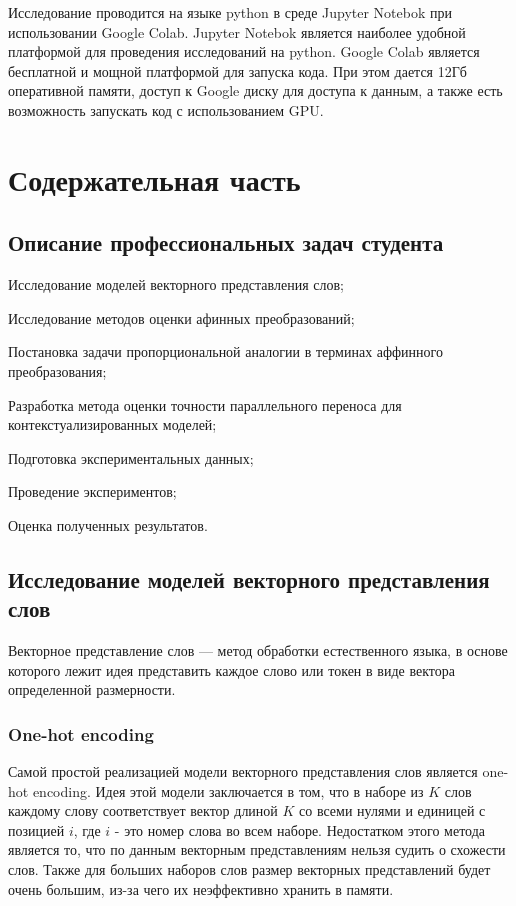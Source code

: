 \documentclass[a4paper,14pt]{article}
\begin{document}
	Исследование проводится на языке python в среде Jupyter Notebok при использовании Google Colab. Jupyter Notebok является наиболее удобной платформой для проведения исследований на python.
	Google Colab является бесплатной и мощной платформой для запуска кода.
	При этом дается 12Гб оперативной памяти, доступ к Google диску для доступа к данным, а также есть возможность запускать код с использованием GPU.
	
	\pagebreak
	\section{Содержательная часть}
	
	\subsection{Описание профессиональных задач студента}
	
	Исследование моделей векторного представления слов;
	
	Исследование методов оценки афинных преобразований;
	
	Постановка задачи пропорциональной аналогии в терминах аффинного преобразования;
	
	Разработка метода оценки точности параллельного переноса для контекстуализированных моделей;
	
	Подготовка экспериментальных данных;
	
	Проведение экспериментов;
	
	Оценка полученных результатов.
	
	
	\subsection{Исследование моделей векторного представления слов}
	
	Векторное представление слов — метод обработки естественного языка, в основе которого лежит идея представить каждое слово или токен в виде вектора определенной размерности.
	
	\subsubsection{One-hot encoding}
	
	Самой простой реализацией модели векторного представления слов является one-hot encoding.
	Идея этой модели заключается в том, что в наборе из $K$ слов каждому слову соответствует вектор длиной $K$ со всеми нулями и единицей с позицией $i$, где $i$ - это номер слова во всем наборе.
	Недостатком этого метода является то, что по данным векторным представлениям нельзя судить о схожести слов.
	Также для больших наборов слов размер векторных представлений будет очень большим, из-за чего их неэффективно хранить в памяти.
	
\end{document}
